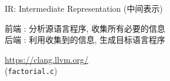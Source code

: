 
\begin{frame}{}
\end{frame}

\begin{frame}{}
  \begin{center}
    \begin{columns}
    \end{columns}
  \end{center}
\end{frame}


\begin{frame}{}
  \begin{center}
    IR: Intermediate Representation (中间表示)
    \vspace{0.50cm}


    \vspace{0.50cm}
    前端 : 分析源语言程序, 收集所有必要的信息 \\[8pt]
    后端 : 利用收集到的信息, 生成目标语言程序
  \end{center}
\end{frame}

\begin{frame}{}
\end{frame}

\begin{frame}{}
  \begin{center}

    \vspace{0.30cm}
    \url{https://clang.llvm.org/}\\[5pt]
    (\texttt{factorial.c})
  \end{center}
\end{frame}

